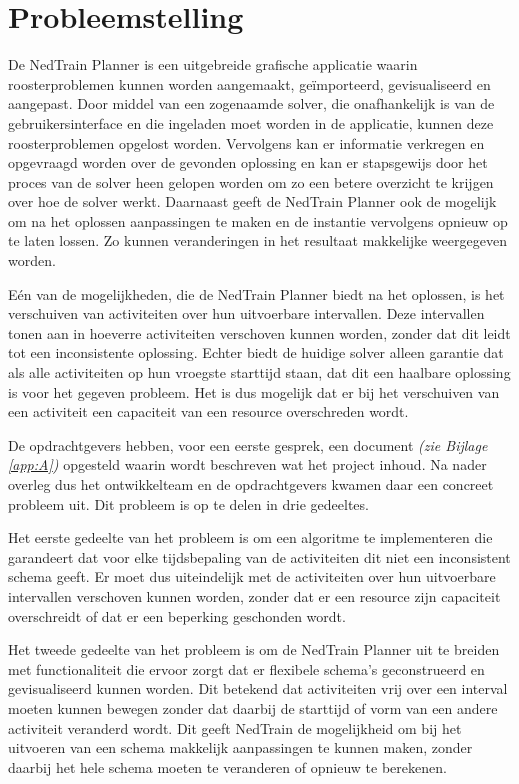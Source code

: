 \section{Probleemstelling}
\label{sec:probleemstelling}

De NedTrain Planner is een uitgebreide grafische applicatie waarin roosterproblemen kunnen worden aangemaakt, ge\"importeerd, gevisualiseerd en aangepast. Door middel van een zogenaamde solver, die onafhankelijk is van de gebruikersinterface en die ingeladen moet worden in de applicatie, kunnen deze roosterproblemen opgelost worden. Vervolgens kan er informatie verkregen en opgevraagd worden over de gevonden oplossing en kan er stapsgewijs door het proces van de solver heen gelopen worden om zo een betere overzicht te krijgen over hoe de solver werkt. Daarnaast geeft de NedTrain Planner ook de mogelijk om na het oplossen aanpassingen te maken en de instantie  vervolgens opnieuw op te laten lossen. Zo kunnen veranderingen in het resultaat makkelijke weergegeven worden.

E\'en van de mogelijkheden, die de NedTrain Planner biedt na het oplossen, is het verschuiven van activiteiten over hun uitvoerbare intervallen. Deze intervallen tonen aan in hoeverre activiteiten verschoven kunnen worden, zonder dat dit leidt tot een inconsistente oplossing. Echter biedt de huidige solver alleen garantie dat als alle activiteiten op hun vroegste starttijd staan, dat dit een haalbare oplossing is voor het gegeven probleem. Het is dus mogelijk dat er bij het verschuiven van een activiteit een capaciteit van een resource overschreden wordt.

De opdrachtgevers hebben, voor een eerste gesprek, een document \emph{(zie Bijlage \ref{app:A})} opgesteld waarin wordt beschreven wat het project inhoud. Na nader overleg dus het ontwikkelteam en de opdrachtgevers kwamen daar een concreet probleem uit. Dit probleem is op te delen in drie gedeeltes. 

Het eerste gedeelte van het probleem is om een algoritme te implementeren die garandeert dat voor elke tijdsbepaling van de activiteiten dit niet een inconsistent schema geeft. Er moet dus uiteindelijk met de activiteiten over hun uitvoerbare intervallen verschoven kunnen worden, zonder dat er een resource zijn capaciteit overschreidt of dat er een beperking geschonden wordt.

Het tweede gedeelte van het probleem is om de NedTrain Planner uit te breiden met functionaliteit die ervoor zorgt dat er flexibele schema's geconstrueerd en gevisualiseerd kunnen worden. Dit betekend dat activiteiten vrij over een interval moeten kunnen bewegen zonder dat daarbij de starttijd of vorm van een andere activiteit veranderd wordt. Dit geeft NedTrain de mogelijkheid om bij het uitvoeren van een schema makkelijk aanpassingen te kunnen maken, zonder daarbij het hele schema moeten te veranderen of opnieuw te berekenen.


